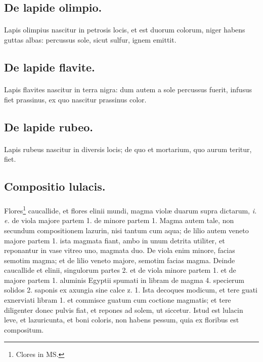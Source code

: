 \documentclass[a4paper, 11pt, oneside, polutonikogreek, italian]{article}
\begin{document}
\subsection{De lapide olimpio.}
\paragraph{}
Lapis olimpius nascitur in petrosis locis, et est duorum colorum, niger habens guttas albas: percussus sole, sicut sulfur, ignem emittit.

\subsection{De lapide flavite.}
\paragraph{}
Lapis flavites nascitur in terra nigra: dum autem a sole percussus fuerit, infusus fiet prassinus, ex quo nascitur prassinus color.

\subsection{De lapide rubeo.}
\paragraph{}
Lapis rubeus nascitur in diversis locis; de quo et mortarium, quo aurum teritur, fiet.

\subsection{Compositio lulacis.}
\paragraph{}
Flores\footnote{Clores in MS.} caucallide, et flores elinii mundi, magma violæ duarum supra dictarum, \emph{i. e.} de viola majore partem 1. de minore partem 1. Magma autem tale, non secundum compositionem lazurin, nisi tantum cum aqua; de lilio autem veneto majore partem 1. ista magmata fiant, ambo in unum detrita utiliter, et reponantur in vase vitreo uno, magmata duo. De viola enim minore, facias semotim magma; et de lilio veneto majore, semotim facias magma. Deinde caucallide et elinii, singulorum partes 2. et de viola minore partem 1. et de majore partem 1. aluminis Egyptii spumati in libram de magma 4. specierum solidos 2. saponis ex axungia sine calce z. 1. Ista decoques modicum, et tere guati exnerviati libram 1. et commisce guatum cum coctione magmatis; et tere diligenter donec pulvis fiat, et repones ad solem, ut siccetur. Istud est lulacin leve, et lazuricunta, et boni coloris, non habens pessum, quia ex floribus est compositum.
\end{document}
